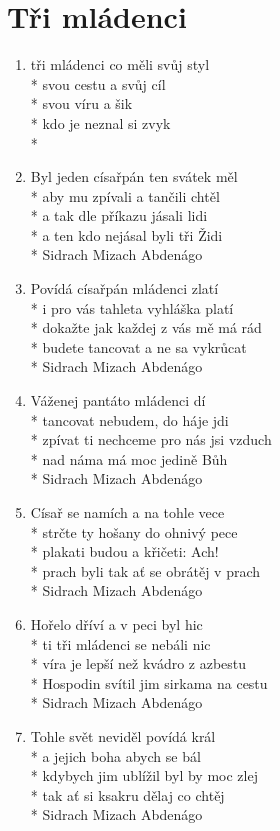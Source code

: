 \section{Tři mládenci} 
\begin{enumerate}
\item {} tři mládenci co měli svůj styl\\*
 svou cestu a  svůj cíl\\*
 svou víru a  šik\\*
 kdo je neznal  si zvyk\\*
   
\item Byl jeden císařpán ten svátek měl\\*
aby mu zpívali a tančili chtěl\\*
a tak dle příkazu jásali lidi\\*
a ten kdo nejásal byli tři Židi\\*
Sidrach Mizach Abdenágo
\item Povídá císařpán mládenci zlatí\\*
i pro vás tahleta vyhláška platí\\*
dokažte jak každej z vás mě má rád\\*
budete tancovat a ne sa vykrůcat\\*
Sidrach Mizach Abdenágo
\item Váženej pantáto mládenci dí\\*
tancovat nebudem, do háje jdi\\*
zpívat ti nechceme pro nás jsi vzduch\\*
nad náma má moc jedině Bůh\\*
Sidrach Mizach Abdenágo
\item Císař se namích a na tohle vece\\*
strčte ty hošany do ohnivý pece\\*
plakati budou a křičeti: Ach!\\*
prach byli tak ať se obrátěj v prach\\*
Sidrach Mizach Abdenágo
\item Hořelo dříví a v peci byl hic\\*
ti tři mládenci se nebáli nic\\*
víra je lepší než kvádro z azbestu\\*
Hospodin svítil jim sirkama na cestu\\*
Sidrach Mizach Abdenágo
\item Tohle svět neviděl povídá král\\*
a jejich boha abych se bál\\*
kdybych jim ublížil byl by moc zlej\\*
tak ať si ksakru dělaj co chtěj\\*
Sidrach Mizach Abdenágo
\end{enumerate}
